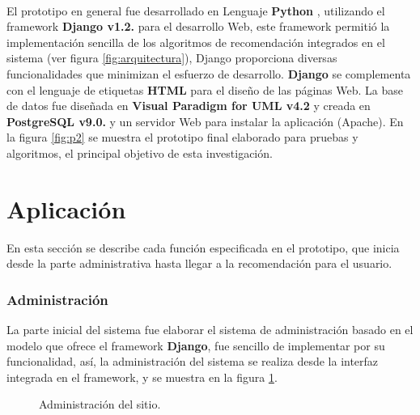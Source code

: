\documentclass[12pt,letterpaper,oneside] {memoir}
\begin{document}
\paragraph*{}
El prototipo en general fue desarrollado en Lenguaje \textbf{Python} \citep{Drake2000}, utilizando el framework \textbf{Django v1.2.} \citep{Django2008} para el desarrollo Web,  este framework permitió la implementación  sencilla de los algoritmos de recomendación integrados en el sistema (ver figura \ref{fig:arquitectura}), Django proporciona diversas funcionalidades que minimizan el esfuerzo de desarrollo. \textbf{Django} se complementa con el lenguaje de etiquetas \textbf{HTML} para el diseño de las páginas Web. 
La base de datos fue diseñada en \textbf{Visual Paradigm for UML v4.2} y creada en \textbf{PostgreSQL v9.0.} y un servidor Web para instalar la aplicación (Apache). 
En la  figura \ref{fig:p2} se muestra el prototipo final elaborado para pruebas y algoritmos, el principal objetivo de esta investigación.

\section{Aplicación}

En esta sección se describe cada función especificada en el prototipo, que inicia desde la parte administrativa hasta llegar a la recomendación para el usuario.

\subsubsection{Administración}
La parte inicial del sistema fue elaborar el sistema de administración basado en el modelo que ofrece el framework \textbf{Django},  fue sencillo de implementar por su funcionalidad, así, la administración del sistema se realiza desde la interfaz integrada en el framework, y se muestra en la figura  \ref{fig:p1}.

\begin{figure}[H]
\centering 
{} \caption{Administración del sitio.} 
\label{fig:p1} 
\end{figure}
\end{document}
